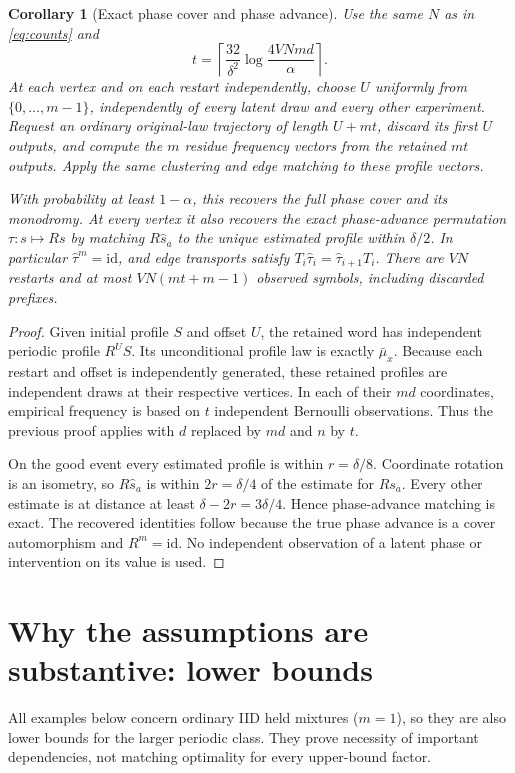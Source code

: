 \documentclass[11pt]{article}
\newtheorem{corollary}[theorem]{Corollary}
\theoremstyle{remark}\newtheorem{remark}[theorem]{Remark}
\newcommand{\id}{\mathrm{id}}
\begin{document}
\begin{corollary}[Exact phase cover and phase advance]\label{cor:periodic}
Use the same $N$ as in \eqref{eq:counts} and
\[
 t=\left\lceil\frac{32}{\delta^2}\log\frac{4VNmd}{\alpha}\right\rceil.
\]
At each vertex and on each restart independently, choose $U$ uniformly from $\{0,\ldots,m-1\}$, independently of every latent draw and every other experiment. Request an ordinary original-law trajectory of length $U+mt$, discard its first $U$ outputs, and compute the $m$ residue frequency vectors from the retained $mt$ outputs. Apply the same clustering and edge matching to these profile vectors.

With probability at least $1-\alpha$, this recovers the full phase cover and its monodromy. At every vertex it also recovers the exact phase-advance permutation $\tau:s\mapsto Rs$ by matching $R\widehat s_a$ to the unique estimated profile within $\delta/2$. In particular $\widehat\tau^m=\id$, and edge transports satisfy $T_i\widehat\tau_i=\widehat\tau_{i+1}T_i$. There are $VN$ restarts and at most $VN(mt+m-1)$ observed symbols, including discarded prefixes.
\end{corollary}
\begin{proof}
Given initial profile $S$ and offset $U$, the retained word has independent periodic profile $R^US$. Its unconditional profile law is exactly $\bar\mu_x$. Because each restart and offset is independently generated, these retained profiles are independent draws at their respective vertices. In each of their $md$ coordinates, empirical frequency is based on $t$ independent Bernoulli observations. Thus the previous proof applies with $d$ replaced by $md$ and $n$ by $t$.

On the good event every estimated profile is within $r=\delta/8$. Coordinate rotation is an isometry, so $R\widehat s_a$ is within $2r=\delta/4$ of the estimate for $Rs_a$. Every other estimate is at distance at least $\delta-2r=3\delta/4$. Hence phase-advance matching is exact. The recovered identities follow because the true phase advance is a cover automorphism and $R^m=\id$. No independent observation of a latent phase or intervention on its value is used.
\end{proof}

\section{Why the assumptions are substantive: lower bounds}
All examples below concern ordinary IID held mixtures ($m=1$), so they are also lower bounds for the larger periodic class. They prove necessity of important dependencies, not matching optimality for every upper-bound factor.
\end{document}
